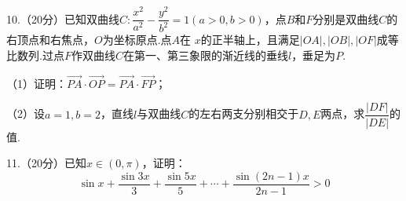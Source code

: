 \newpage

10.（20分）已知双曲线$C:\dfrac{x^2}{a^2}-\dfrac{y^2}{b^2}=1(a>0,b>0)$，点$B$和$F$分别是双曲线$C$的右顶点和右焦点，$O$为坐标原点.点$A$在
$x$的正半轴上，且满足$|OA|,|OB|,|OF|$成等比数列.过点$F$作双曲线$C$在第一、第三象限的渐近线的垂线$l$，垂足为$P$.

（1）证明：$\overrightarrow{PA}\cdot \overrightarrow{OP}=\overrightarrow{PA}\cdot \overrightarrow{FP}$；

（2）设$a=1,b=2$，直线$l$与双曲线$C$的左右两支分别相交于$D,E$两点，求$\dfrac{|DF|}{|DE|}$的值.

\vspace*{100mm}

11.（20分）已知$x\in (0,\pi)$，证明：
\[
    \sin{x}+\frac{\sin{3x}}{3}+\frac{\sin{5x}}{5}+\cdots+\frac{\sin{(2n-1)x}}{2n-1}>0
\]


